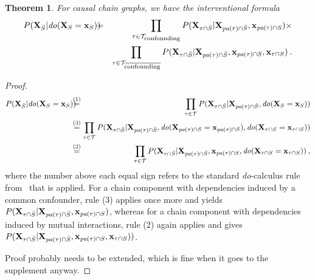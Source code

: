 \documentclass{article}
\newcommand{\vX}{\mathbf{X}}
\newcommand{\vx}{\mathbf{x}}
\newcommand{\dodo}{\mathit{do}}
\newcommand{\lvdo}[1]{\dodo(\vX_{#1} = \vx_{#1})}
\newcommand{\spa}{\mathop{\textit{\scriptsize pa}}}
\newcommand{\isequal}{\hspace*{-2.5mm} & = & \hspace*{-2.5mm}}
\newcommand{\chaincomponents}{{\cal T}}
\newcommand{\isequaldo}[1]{\hspace*{-2.5mm} & \overset{(#1)}{=} & \hspace*{-2.5mm}}
\newcommand{\comment}[1]{{\color{red} #1}}
\newtheorem{theorem}{Theorem}
\begin{document}
\begin{theorem}
For causal chain graphs, we have the interventional formula
\begin{eqnarray*}
P(\vX_{\bar{S}}|\lvdo{S}) \isequal \prod_{\tau \in \chaincomponents_{\textrm{\upshape \scriptsize confounding}}} P(\vX_{\tau \cap \bar{S}}|\vX_{\spa(\tau)  \cap \bar{S}},\vx_{\spa(\tau) \cap S}) \times \\
&& \prod_{\tau \in \chaincomponents_{\overline{\textrm{\upshape \scriptsize confounding}}}} P(\vX_{\tau \cap \bar{S}}|\vX_{\spa(\tau) \cap \bar{S}},\vx_{\spa(\tau) \cap S},\vx_{\tau \cap S}) \: .
\end{eqnarray*}
\end{theorem}

\begin{proof}
\begin{eqnarray*}
	P(\vX_{\bar{S}}|\lvdo{S}) \isequaldo{1} \prod_{\tau \in \chaincomponents} P(\vX_{\tau \cap \bar{S}}|\vX_{\spa(\tau)  \cap \bar{S}},\lvdo{S}) \hfill \\
	\isequaldo{3}  \prod_{\tau \in \chaincomponents} P(\vX_{\tau \cap \bar{S}}|\vX_{\spa(\tau)  \cap \bar{S}},\lvdo{\spa(\tau) \cap S},\lvdo{\tau \cap S}) \\
	\isequaldo{2}  \prod_{\tau \in \chaincomponents} P(\vX_{\tau \cap \bar{S}}|\vX_{\spa(\tau)  \cap \bar{S}},\vx_{\spa(\tau) \cap S},\lvdo{\tau \cap S}) \: ,
\end{eqnarray*}
where the number above each equal sign refers to the standard \textit{do}-calculus rule from~\cite{pearl2012calculus} that is applied. For a chain component with dependencies induced by a common confounder, rule (3) applies once more and yields $P(\vX_{\tau \cap \bar{S}}|\vX_{\spa(\tau)  \cap \bar{S}},\vx_{\spa(\tau) \cap S})$,
whereas for a chain component with dependencies induced by mutual interactions, rule (2) again applies and gives $P(\vX_{\tau \cap \bar{S}}|\vX_{\spa(\tau)  \cap \bar{S}},\vx_{ \spa(\tau) \cap S},\vx_{\tau \cap S}))$.

\comment{Proof probably needs to be extended, which is fine when it goes to the supplement anyway.}
\end{proof}
\end{document}

